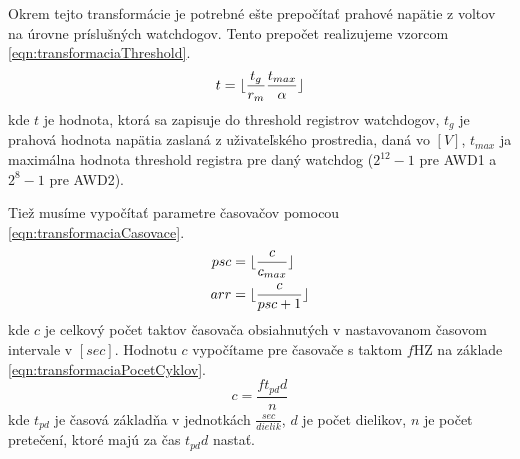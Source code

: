 \documentclass[main.tex]{subfiles}
\begin{document}
	Okrem tejto transformácie je potrebné ešte prepočítať prahové napätie z voltov na úrovne príslušných watchdogov. Tento prepočet realizujeme vzorcom \cref{eqn:transformaciaThreshold}.
	\begin{equation}
	 	t = \lfloor\frac{t_g}{r_m} \frac{t_{max}}{\alpha}\rfloor
	\label{eqn:transformaciaThreshold}
	\end{equation}
	kde $t$ je hodnota, ktorá sa zapisuje do threshold registrov watchdogov, $t_g$ je prahová hodnota napätia zaslaná z uživateľského prostredia, daná vo $[V]$, $t_{max}$ ja maximálna hodnota threshold registra pre daný watchdog ($2^{12}-1$ pre AWD1 a $2^{8}-1$ pre AWD2).
	
	Tiež musíme vypočítať parametre časovačov pomocou \cref{eqn:transformaciaCasovace}.
	\begin{equation}
		\begin{split}
				psc &= \lfloor\frac{c}{c_{max}}\rfloor \\
				arr &= \lfloor\frac{c}{psc + 1}\rfloor \\
		\end{split}
		\label{eqn:transformaciaCasovace}
	\end{equation}
	kde $c$ je celkový počet taktov časovača obsiahnutých v nastavovanom časovom intervale v $[sec]$. Hodnotu $c$ vypočítame pre časovače s taktom $f$HZ na základe \cref{eqn:transformaciaPocetCyklov}.
	\begin{equation}
		c = \frac{f t_{pd} d }{n}
		\label{eqn:transformaciaPocetCyklov}
	\end{equation}
	kde $t_{pd}$ je časová základňa v jednotkách $\frac{sec}{dielik}$, $d$ je počet dielikov, $n$ je počet pretečení, ktoré majú za čas $t_{pd}d$ nastať.
\end{document}
